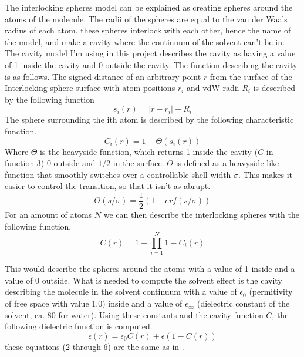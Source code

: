 \documentclass[a4paper,11pt]{article}
\begin{document}
The interlocking spheres model can be explained as creating spheres
around the atoms of the molecule. The radii of the spheres are equal
to the van der Waals radius of each atom. these spheres interlock with
each other, hence the name of the model, and make a cavity where the
continuum of the solvent can't be in.  The cavity model I'm using in
this project describes the cavity as having a value of 1 inside the
cavity and 0 outside the cavity. The function describing the cavity is
as follows.  The signed distance of an arbitrary point $r$ from the
surface of the Interlocking-sphere surface with atom positions $r_i$
and \ac{vdW} radii $R_i$ is described by the following function
\begin{equation}
s_i(r) = \vert r - r_i\vert - R_i
\end{equation}
The sphere surrounding the ith atom is described by the following characteristic function.
\begin{equation}
C_i(r) = 1 - \Theta (s_i(r)) 
\end{equation}
Where $\Theta$ is the heavyside function, which returns 1 inside the
cavity ($C$ in function 3) 0 outside and $1/2$ in the
surface. $\Theta$ is defined as a heavyside-like function that
smoothly switches over a controllable shell width $\sigma$. This makes
it easier to control the transition, so that it isn't as abrupt.
\begin{equation}
\Theta (s/\sigma) = \frac{1}{2} (1 + erf(s/\sigma))
\end{equation}
For an amount of atoms $N$ we can then describe the interlocking spheres with the following function.
\begin{equation}
C(r) = 1 - \prod_{i=1}^{N} 1 - C_i (r)
\end{equation}

This would describe the spheres around the atoms with a value of 1
inside and a value of 0 outside. What is needed to compute the solvent
effect is the cavity describing the molecule in the solvent continuum
with a value of $\epsilon_0$ (permitivity of free space with value
1.0) inside and a value of $\epsilon_\infty$ (dielectric constant of
the solvent, ca. 80 for water). Using these constants and the cavity
function $C$, the following dielectric function is computed.
\begin{equation}
\epsilon (r) = \epsilon_0 C(r) + \epsilon (1 - C(r))
\end{equation}
these equations (2 through 6) are the same as in \cite{FossoTande:2013ka}. 
\end{document}
